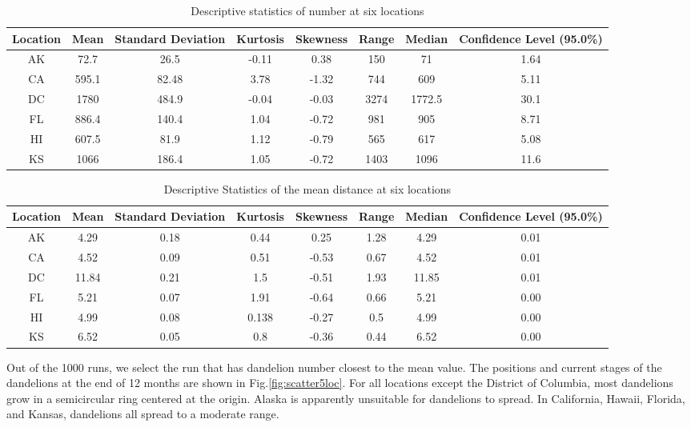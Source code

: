 \documentclass[12pt]{article}
\begin{document}
			{
				\fontsize{10}{14}\selectfont
				{
					\begin{longtable}{cccccccc}
						\caption{Descriptive statistics of number at six locations}
						\label{tb:numDistribution}\\
						\toprule
						Location&Mean&Standard Deviation&Kurtosis&Skewness&Range&Median&Confidence Level (95.0\%)\\
						\toprule
						AK&72.7&26.5&-0.11&0.38&150&71&1.64\\
						CA&595.1&82.48&3.78&-1.32&744&609&5.11\\
						DC&1780&484.9&-0.04&-0.03&3274&1772.5&30.1\\
						FL&886.4&140.4&1.04&-0.72&981&905&8.71\\
						HI&607.5&81.9&1.12&-0.79&565&617&5.08\\
						KS&1066&186.4&1.05&-0.72&1403&1096&11.6\\
						\bottomrule
					\end{longtable}
					
				}
			}
			
			{
				\fontsize{10}{14}\selectfont
				{
					\begin{longtable}{cccccccc}
						\caption{Descriptive Statistics of the mean distance at six locations}
						\label{tb:distDistribution}\\
						\toprule
						Location&Mean&Standard Deviation&Kurtosis&Skewness&Range&Median&Confidence Level (95.0\%)\\
						\toprule
						AK&4.29&0.18&0.44&0.25&1.28&4.29&0.01\\
						CA&4.52&0.09&0.51&-0.53&0.67&4.52&0.01\\
						DC&11.84&0.21&1.5&-0.51&1.93&11.85&0.01\\
						FL&5.21&0.07&1.91&-0.64&0.66&5.21&0.00\\
						HI&4.99&0.08&0.138&-0.27&0.5&4.99&0.00\\
						KS&6.52&0.05&0.8&-0.36&0.44&6.52&0.00\\
						\bottomrule
					\end{longtable}
				}
			}
			
			Out of the 1000 runs, we select the run that has dandelion number closest to the mean value.  The positions and current stages of the dandelions at the end of 12 months are shown in Fig.\ref{fig:scatter5loc}.  For all locations except the District of Columbia, most dandelions grow in a semicircular ring centered at the origin.  Alaska is apparently unsuitable for dandelions to spread.  In California, Hawaii, Florida, and Kansas, dandelions all spread to a moderate range.
			
\end{document}
